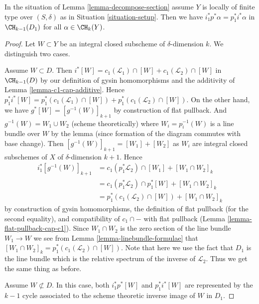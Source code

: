 \begin{lemma}
\label{lemma-decompose-section-formulae}
In the situation of Lemma \ref{lemma-decompose-section}
assume $Y$ is locally of finite type over $(S, \delta)$ as in
Situation \ref{situation-setup}. Then we have
$i_1^*p^*\alpha = p_1^*i^*\alpha$
in $\CH_{k - 1}(D_1)$ for all $\alpha \in \CH_k(Y)$.
\end{lemma}

\begin{proof}
Let $W \subset Y$ be an integral closed subscheme of $\delta$-dimension $k$.
We distinguish two cases.

\medskip\noindent
Assume $W \subset D$. Then
$i^*[W] = c_1(\mathcal{L}_1) \cap [W] + c_1(\mathcal{L}_2) \cap [W]$
in $\CH_{k - 1}(D)$ by our definition of gysin homomorphisms and the
additivity of Lemma \ref{lemma-c1-cap-additive}.
Hence $p_1^*i^*[W] =
p_1^*(c_1(\mathcal{L}_1) \cap [W]) + p_1^*(c_1(\mathcal{L}_2) \cap [W])$.
On the other hand, we have
$g^*[W] = [g^{-1}(W)]_{k + 1}$ by construction of flat pullback.
And $g^{-1}(W) = W_1 \cup W_2$ (scheme theoretically)
where $W_i = p_i^{-1}(W)$ is a line bundle over $W$
by the lemma (since formation of the diagram commutes with base change).
Then $[g^{-1}(W)]_{k + 1} = [W_1] + [W_2]$ as $W_i$ are integral closed
subschemes of $X$ of $\delta$-dimension $k + 1$. Hence
\begin{align*}
i_1^*[g^{-1}(W)]_{k + 1}
& =
c_1(p_1^*\mathcal{L}_2) \cap [W_1] + [W_1 \cap W_2]_k \\
& =
c_1(p_1^*\mathcal{L}_2) \cap p_1^*[W] + [W_1 \cap W_2]_k \\
& =
p_1^*(c_1(\mathcal{L}_2) \cap [W]) + [W_1 \cap W_2]_k
\end{align*}
by construction of gysin homomorphisms, the definition of flat pullback
(for the second equality), and compatibility of $c_1 \cap -$
with flat pullback (Lemma \ref{lemma-flat-pullback-cap-c1}).
Since $W_1 \cap W_2$ is the zero section of the line bundle
$W_1 \to W$ we see from Lemma \ref{lemma-linebundle-formulae}
that $[W_1 \cap W_2]_k = p_1^*(c_1(\mathcal{L}_2) \cap [W])$.
Note that here we use the fact that $D_1$ is the line bundle
which is the relative spectrum of the inverse of $\mathcal{L}_2$.
Thus we get the same thing as before.

\medskip\noindent
Assume $W \not \subset D$. In this case, both $i_1^*p^*[W]$
and $p_1^*i^*[W]$ are represented by the $k - 1$ cycle associated
to the scheme theoretic inverse image of $W$ in $D_1$.
\end{proof}

